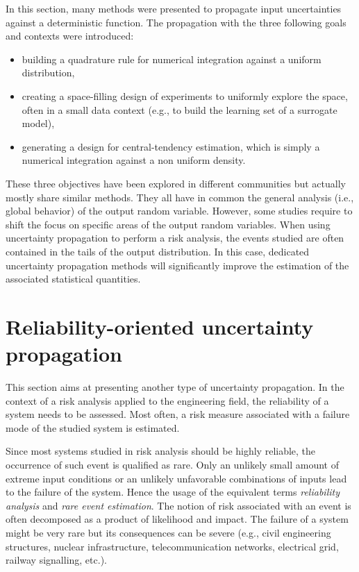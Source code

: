 In this section, many methods were presented to propagate input uncertainties against a deterministic function.
The propagation with the three following goals and contexts were introduced: 
\begin{itemize}
    \item building a quadrature rule for numerical integration against a uniform distribution,
    \item creating a space-filling design of experiments to uniformly explore the space, often in a small data context (e.g., to build the learning set of a surrogate model),
    \item generating a design for central-tendency estimation, which is simply a numerical integration against a non uniform density.
\end{itemize} 
These three objectives have been explored in different communities but actually mostly share similar methods. 
They all have in common the general analysis (i.e., global behavior) of the output random variable. 
However, some studies require to shift the focus on specific areas of the output random variables.
When using uncertainty propagation to perform a risk analysis, the events studied are often contained in the tails of the output distribution. 
In this case, dedicated uncertainty propagation methods will significantly improve the estimation of the associated statistical quantities.


\section{Reliability-oriented uncertainty propagation}

This section aims at presenting another type of uncertainty propagation. 
In the context of a risk analysis applied to the engineering field, the reliability of a system needs to be assessed. 
Most often, a risk measure associated with a failure mode of the studied system is estimated. 

Since most systems studied in risk analysis should be highly reliable, the occurrence of such event is qualified as rare. 
Only an unlikely small amount of extreme input conditions or an unlikely unfavorable combinations of inputs lead to the failure of the system. 
Hence the usage of the equivalent terms \textit{reliability analysis} and \textit{rare event estimation}. 
The notion of risk associated with an event is often decomposed as a product of likelihood and impact. 
The failure of a system might be very rare but its consequences can be severe (e.g., civil engineering structures, nuclear infrastructure, telecommunication networks, electrical grid, railway signalling, etc.).

